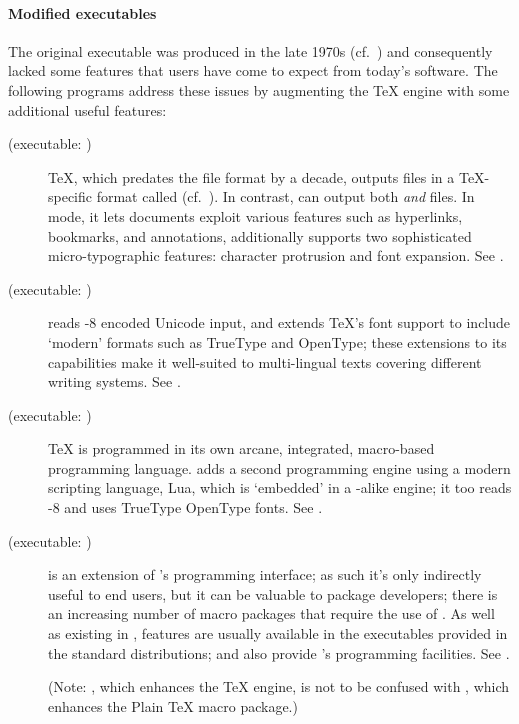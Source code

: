 \paragraph{Modified  executables}
The original  executable was produced in the late 1970s
(cf.~) and consequently
lacked some features that users have come to expect from today's
software.  The following programs address these issues by augmenting
the \TeX{} engine with some additional useful features:

\begin{description}
  \item[\PDFTeX{} (executable: )]
  \TeX{}, which predates the  file format by a decade,
  outputs files in a \TeX{}-specific format called 
  (cf.~).  In
  contrast, \PDFTeX{} can output both  \emph{and} 
  files.  In  mode, it lets documents exploit various
   features such as hyperlinks, bookmarks, and annotations,
  \PDFTeX{} additionally supports two sophisticated micro-typographic
  features: character protrusion and font expansion.  See
  .

  \item[\xetex{} (executable: )]
  \xetex{} reads -8 encoded Unicode input, and extends
  \TeX{}'s font support to include `modern' formats such as TrueType
  and OpenType; these extensions to its capabilities make it
  well-suited to multi-lingual texts covering different writing
  systems.  See .

  \item[\LuaTeX{} (executable: )]
  \TeX{} is programmed in its own arcane, integrated, macro-based
  programming language.  \LuaTeX{} adds a second programming engine
  using a modern scripting language, Lua, which is `embedded' in a
  \tex{}-alike engine; it too reads -8 and uses TrueType
  OpenType fonts.  See %
  .

  \item[\eTeX{} (executable: )]
  \eTeX{} is an extension of \tex{}'s programming interface; as such
  it's only indirectly useful to end users, but it can be valuable to
  package developers; there is an increasing number of macro packages
  that require the use of \eTeX{}.  As well as existing in
  , \eTeX{} features are usually available in the
   executables provided in the standard
  distributions; \xetex{} and \luatex{} also provide \etex{}'s
  programming facilities.    See %
  .

  (Note: \eTeX{}, which enhances the \TeX{} engine, is not to be
  confused with \Eplain{}, which enhances the Plain \TeX{} macro
  package.)
\end{description}

